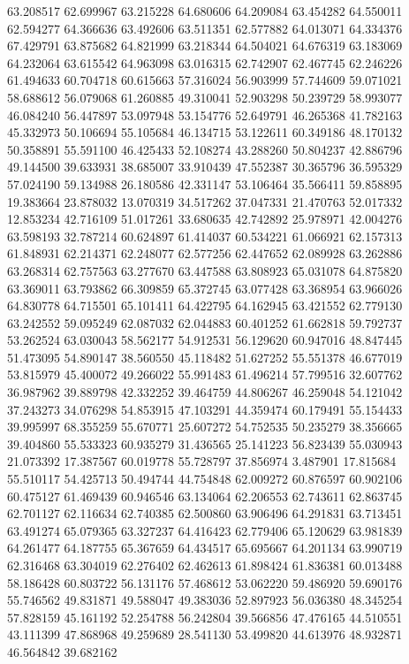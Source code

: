 63.208517
62.699967
63.215228
64.680606
64.209084
63.454282
64.550011
62.594277
64.366636
63.492606
63.511351
62.577882
64.013071
64.334376
67.429791
63.875682
64.821999
63.218344
64.504021
64.676319
63.183069
64.232064
63.615542
64.963098
63.016315
62.742907
62.467745
62.246226
61.494633
60.704718
60.615663
57.316024
56.903999
57.744609
59.071021
58.688612
56.079068
61.260885
49.310041
52.903298
50.239729
58.993077
46.084240
56.447897
53.097948
53.154776
52.649791
46.265368
41.782163
45.332973
50.106694
55.105684
46.134715
53.122611
60.349186
48.170132
50.358891
55.591100
46.425433
52.108274
43.288260
50.804237
42.886796
49.144500
39.633931
38.685007
33.910439
47.552387
30.365796
36.595329
57.024190
59.134988
26.180586
42.331147
53.106464
35.566411
59.858895
19.383664
23.878032
13.070319
34.517262
37.047331
21.470763
52.017332
12.853234
42.716109
51.017261
33.680635
42.742892
25.978971
42.004276
63.598193
32.787214
60.624897
61.414037
60.534221
61.066921
62.157313
61.848931
62.214371
62.248077
62.577256
62.447652
62.089928
63.262886
63.268314
62.757563
63.277670
63.447588
63.808923
65.031078
64.875820
63.369011
63.793862
66.309859
65.372745
63.077428
63.368954
63.966026
64.830778
64.715501
65.101411
64.422795
64.162945
63.421552
62.779130
63.242552
59.095249
62.087032
62.044883
60.401252
61.662818
59.792737
53.262524
63.030043
58.562177
54.912531
56.129620
60.947016
48.847445
51.473095
54.890147
38.560550
45.118482
51.627252
55.551378
46.677019
53.815979
45.400072
49.266022
55.991483
61.496214
57.799516
32.607762
36.987962
39.889798
42.332252
39.464759
44.806267
46.259048
54.121042
37.243273
34.076298
54.853915
47.103291
44.359474
60.179491
55.154433
39.995997
68.355259
55.670771
25.607272
54.752535
50.235279
38.356665
39.404860
55.533323
60.935279
31.436565
25.141223
56.823439
55.030943
21.073392
17.387567
60.019778
55.728797
37.856974
3.487901
17.815684
55.510117
54.425713
50.494744
44.754848
62.009272
60.876597
60.902106
60.475127
61.469439
60.946546
63.134064
62.206553
62.743611
62.863745
62.701127
62.116634
62.740385
62.500860
63.906496
64.291831
63.713451
63.491274
65.079365
63.327237
64.416423
62.779406
65.120629
63.981839
64.261477
64.187755
65.367659
64.434517
65.695667
64.201134
63.990719
62.316468
63.304019
62.276402
62.462613
61.898424
61.836381
60.013488
58.186428
60.803722
56.131176
57.468612
53.062220
59.486920
59.690176
55.746562
49.831871
49.588047
49.383036
52.897923
56.036380
48.345254
57.828159
45.161192
52.254788
56.242804
39.566856
47.476165
44.510551
43.111399
47.868968
49.259689
28.541130
53.499820
44.613976
48.932871
46.564842
39.682162
